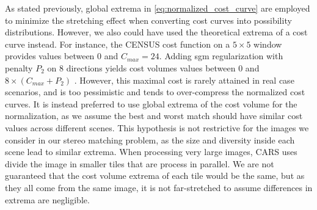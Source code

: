 As stated previously, global extrema in \cref{eq:normalized_cost_curve} are employed to minimize the stretching effect when converting cost curves into possibility distributions. However, we also could have used the theoretical extrema of a cost curve instead. For instance, the CENSUS cost function on a $5\times5$ window provides values between $0$ and $C_{max}=24$. Adding \acrshort{sgm} regularization with penalty $P_2$ on $8$ directions yields cost volumes values between $0$ and $8\times(C_{max}+P_2)$ \cite{hirschmuller_accurate_2005}. However, this maximal cost is rarely attained in real case scenarios, and is too pessimistic and tends to over-compress the normalized cost curves. It is instead preferred to use global extrema of the cost volume for the normalization, as we assume the best and worst match should have similar cost values across different scenes. This hypothesis is not restrictive for the images we consider in our stereo matching problem, as the size and diversity inside each scene lead to similar extrema.  When processing very large images, CARS uses divide the image in smaller tiles that are process in parallel. We are not guaranteed that the cost volume extrema of each tile would be the same, but as they all come from the same image, it is not far-stretched to assume differences in extrema are negligible. 

